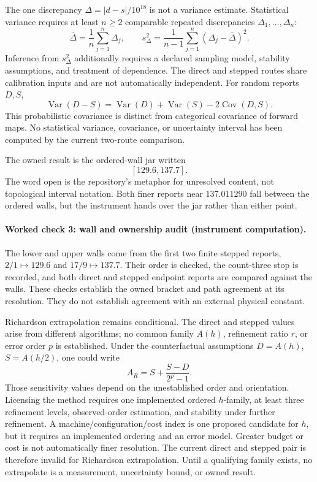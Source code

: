 The one discrepancy \(\Delta=|d-s|/10^{18}\) is not a variance estimate.  Statistical variance requires at least
\(n\ge2\) comparable repeated discrepancies \(\Delta_1,\ldots,\Delta_n\):
\[
 \bar\Delta=\frac1n\sum_{j=1}^n\Delta_j,\qquad
 s_\Delta^2=\frac1{n-1}\sum_{j=1}^n(\Delta_j-\bar\Delta)^2.
\]
Inference from \(s_\Delta^2\) additionally requires a declared sampling model, stability assumptions, and treatment of
dependence.  The direct and stepped routes share calibration inputs and are not automatically independent.  For random
reports \(D,S\),
\[
 \operatorname{Var}(D-S)=\operatorname{Var}(D)+\operatorname{Var}(S)
                         -2\operatorname{Cov}(D,S).
\]
This probabilistic covariance is distinct from categorical covariance of forward maps.  No statistical variance,
covariance, or uncertainty interval has been computed by the current two-route comparison.

The owned result is the ordered-wall jar written
\[
                              [129.6,137.7].
\]
The word open is the repository's metaphor for unresolved content, not topological interval notation.  Both finer
reports near \(137.011290\) fall between the ordered walls, but the instrument hands over the jar rather than either
point.

\paragraph{Worked check 3: wall and ownership audit (instrument computation).}
The lower and upper walls come from the first two finite stepped reports, \(2/1\mapsto129.6\) and
\(17/9\mapsto137.7\).  Their order is checked, the count-three stop is recorded, and both direct and stepped endpoint
reports are compared against the walls.  These checks establish the owned bracket and path agreement at its
resolution.  They do not establish agreement with an external physical constant.

Richardson extrapolation remains conditional.  The direct and stepped values arise from different algorithms; no
common family \(A(h)\), refinement ratio \(r\), or error order \(p\) is established.  Under the counterfactual
assumptions \(D=A(h)\), \(S=A(h/2)\), one could write
\[
                           A_R=S+\frac{S-D}{2^p-1}.
\]
Those sensitivity values depend on the unestablished order and orientation.  Licensing the method requires one
implemented ordered \(h\)-family, at least three refinement levels, observed-order estimation, and stability under
further refinement.  A machine/configuration/cost index is one proposed candidate for \(h\), but it requires an
implemented ordering and an error model.  Greater budget or cost is not automatically finer resolution.  The current
direct and stepped pair is therefore invalid for Richardson extrapolation.  Until a qualifying family exists, no
extrapolate is a measurement, uncertainty bound, or owned result.

